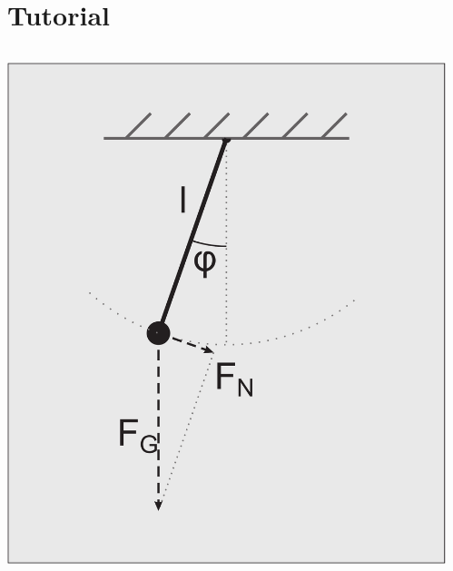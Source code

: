 \section{Tutorial}



\begin{frame}
  \tableofcontents[currentsection] 
\end{frame}


\begin{frame}[fragile]


\vspace{2ex}

\begin{columns}[T]
  \begin{column}{0.35\textwidth}
    \includegraphics[draft=false,width=1.0\textwidth]{pendulum.pdf}

   \vspace{4ex}
  \end{column}

  \begin{column}{0.65\textwidth}
\end{column}
\end{columns}
\end{frame}
